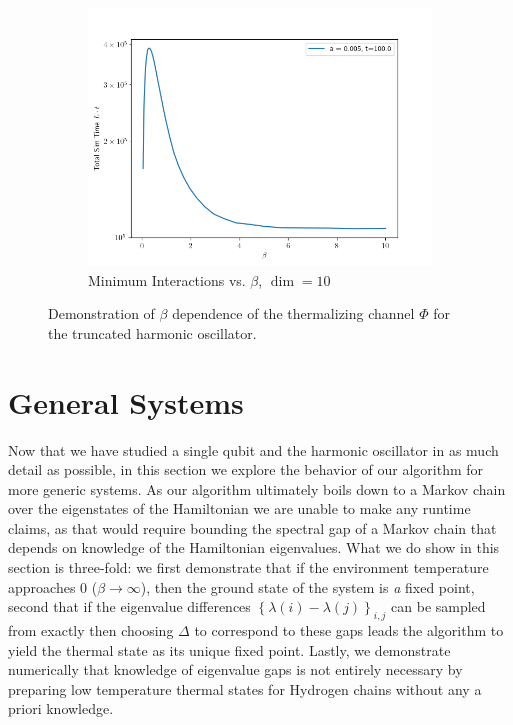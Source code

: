 \documentclass{article}
\newcommand{\set}[1]{\left\{ #1 \right\}}
\begin{document}
\begin{figure}
\begin{subfigure}{0.55\textwidth}
    \includegraphics[width=\textwidth]{numerics/data/sho_big_peak.png}
    \caption{Minimum Interactions vs. $\beta$, $\dim = 10$}
    \label{fig:sho_l_vs_beta_dim_10}
    \end{subfigure}
    \caption{Demonstration of $\beta$ dependence of the thermalizing channel $\Phi$ for the truncated harmonic oscillator.}
    \label{fig:sho_total_time_vs_beta}
\end{figure}




\section{General Systems}
 Now that we have studied a single qubit and the harmonic oscillator in as much detail as possible, in this section we explore the behavior of our algorithm for more generic systems. As our algorithm ultimately boils down to a Markov chain over the eigenstates of the Hamiltonian we are unable to make any runtime claims, as that would require bounding the spectral gap of a Markov chain that depends on knowledge of the Hamiltonian eigenvalues. What we do show in this section is three-fold: we first demonstrate that if the environment temperature approaches 0 ($\beta \to \infty$), then the ground state of the system is \emph{a} fixed point, second that if the eigenvalue differences $\set{\lambda(i) - \lambda(j)}_{i, j}$ can be sampled from exactly then choosing $\Delta$ to correspond to these gaps leads the algorithm to yield the thermal state as its unique fixed point. Lastly, we demonstrate numerically that knowledge of eigenvalue gaps is not entirely necessary by preparing low temperature thermal states for Hydrogen chains without any a priori knowledge.
\end{document}
